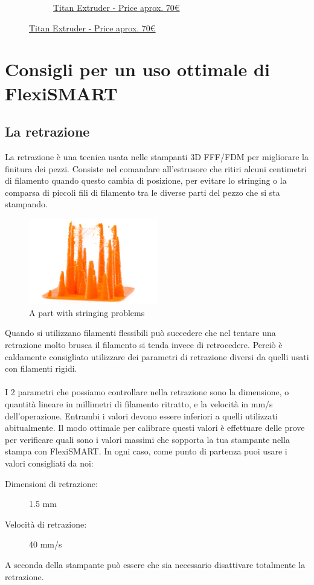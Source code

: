 \documentclass[11pt,a4paper]{article}
\begin{document}
\begin{figure}[H]
\begin{subfigure}[b]{0.4\textwidth}
		\caption*{\href{www.e3d-online.com}{{\footnotesize Titan Extruder - Price aprox. 70\euro}}}
    \end{subfigure}
\end{figure}
\section{Consigli per un uso ottimale di FlexiSMART}
	\subsection{La retrazione}
La retrazione è una tecnica usata nelle stampanti 3D FFF/FDM per migliorare la finitura dei pezzi. Consiste nel comandare all'estrusore che ritiri alcuni centimetri di filamento quando questo cambia di posizione, per evitare lo stringing o la comparsa di piccoli fili di filamento tra le diverse parti del pezzo che si sta stampando.
\begin{figure}[H]
\centering
\includegraphics[width=0.5\textwidth,cfbox=azul_marcos 4pt 0pt]{FOTOS/RETRACCION1}
\caption*{A part with stringing problems}
\end{figure}
Quando si utilizzano filamenti flessibili può succedere che nel tentare una retrazione molto brusca il filamento si tenda invece di retrocedere. Perciò è caldamente consigliato utilizzare dei parametri di retrazione diversi da quelli usati con filamenti rigidi.
\\\\
I 2 parametri che possiamo controllare nella retrazione sono la dimensione, o quantità lineare in millimetri di filamento ritratto, e la velocità in mm/s dell'operazione. Entrambi i valori devono essere inferiori a quelli utilizzati abitualmente. Il modo ottimale per calibrare questi valori è effettuare delle prove per verificare quali sono i valori massimi che sopporta la tua stampante nella stampa con FlexiSMART. In ogni caso, come punto di partenza puoi usare i valori consigliati da noi:
\begin{description}
\item [Dimensioni di retrazione:] 1.5 mm
\item [Velocità di retrazione:] 40 mm/s
\end{description}
A seconda della stampante può essere che sia necessario disattivare totalmente la retrazione.
\end{document}
